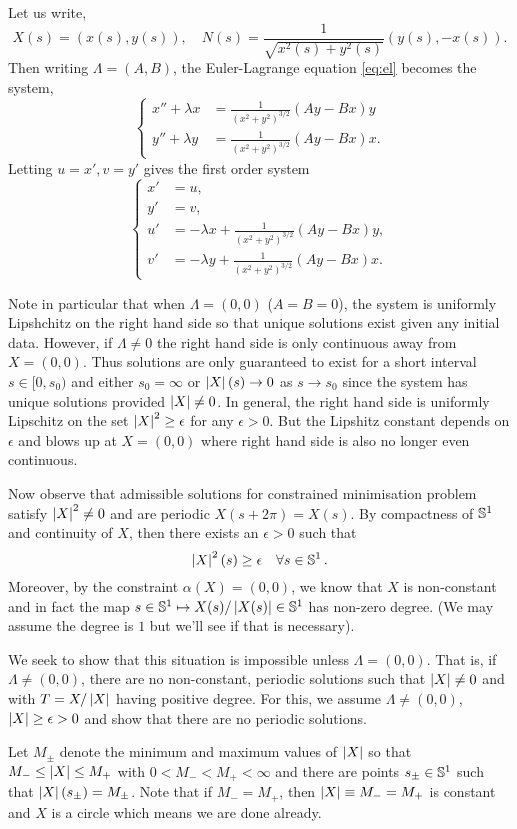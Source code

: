\documentclass[12pt]{article}
\begin{document}
Let us write,
\[
X(s) = (x(s), y(s)), \quad N(s) = \frac{1}{\sqrt{x^2(s) + y^2(s)}} (y(s), -x(s)).
\]
Then writing \(\Lambda = (A, B)\), the Euler-Lagrange equation \eqref{eq:el} becomes the system,
\[
\begin{cases}
x'' + \lambda x &= \frac{1}{(x^2 + y^2)^{3/2}} (Ay - Bx) y \\
y'' + \lambda y &= \frac{1}{(x^2 + y^2)^{3/2}} (Ay - Bx) x.
\end{cases}
\]
Letting \(u = x', v = y'\) gives the first order system
\begin{equation}
\label{eq:ode}
\begin{cases}
x' &= u, \\
y' &= v, \\
u' &= -\lambda x + \frac{1}{(x^2 + y^2)^{3/2}} (Ay - Bx) y, \\
v' &= -\lambda y + \frac{1}{(x^2 + y^2)^{3/2}} (Ay - Bx) x.
\end{cases}
\end{equation}

Note in particular that when \(\Lambda = (0, 0)\) (\(A = B = 0\)), the system is uniformly Lipshchitz on the right hand side so that unique solutions exist given any initial data. However, if \(\Lambda \ne 0\) the right hand side is only continuous away from \(X = (0, 0)\). Thus solutions are only guaranteed to exist for a short interval \(s \in [0, s_0)\) and either \(s_0 = \infty\) or \(\left|{X}\right|(s) \to 0\) as \(s \to s_0\) since the system has unique solutions provided \(\left|{X}\right| \ne 0\). In general, the right hand side is uniformly Lipschitz on the set \(\left|{X}\right|^2 \geq \epsilon\) for any \(\epsilon > 0\). But the Lipshitz constant depends on \(\epsilon\) and blows up at \(X = (0, 0)\) where right hand side is also no longer even continuous.

Now observe that admissible solutions for constrained minimisation problem satisfy \(\left|{X}\right|^2 \ne 0\) and are periodic \(X(s + 2\pi) = X(s)\). By compactness of \(\operatorname{\mathbb{S}^1}\) and continuity of \(X\), then there exists an \(\epsilon > 0\) such that
\begin{equation}
\label{eq:non_degen}
\left|{X}\right|^2(s) \geq \epsilon \quad \forall s \in \operatorname{\mathbb{S}^1}.
\end{equation}
Moreover, by the constraint \(\alpha(X) = (0, 0)\), we know that \(X\) is non-constant and in fact the map \(s \in \operatorname{\mathbb{S}^1} \mapsto X(s)/\left|{X(s)}\right| \in \operatorname{\mathbb{S}^1}\) has non-zero degree. ({\color{red}We may assume the degree is \(1\) but we'll see if that is necessary}).

We seek to show that this situation is impossible unless \(\Lambda = (0, 0)\). That is, if \(\Lambda \ne (0, 0)\), there are no non-constant, periodic solutions such that \(\left|{X}\right| \ne 0\) and with \(T = X/\left|{X}\right|\) having positive degree. For this, we assume \(\Lambda \ne (0, 0)\), \(\left|{X}\right| \geq \epsilon > 0\) and show that there are no periodic solutions.

Let \(M_{\pm}\) denote the minimum and maximum values of \(\left|{X}\right|\) so that \(M_- \leq \left|{X}\right| \leq M_+\) with \(0 < M_- < M_+ < \infty\) and there are points \(s_{\pm} \in \operatorname{\mathbb{S}^1}\) such that \(\left|{X}\right|(s_{\pm}) = M_{\pm}\). Note that if \(M_- = M_+\), then \(\left|{X}\right| \equiv M_- = M_+\) is constant and \(X\) is a circle which means we are done already. 
\end{document}

